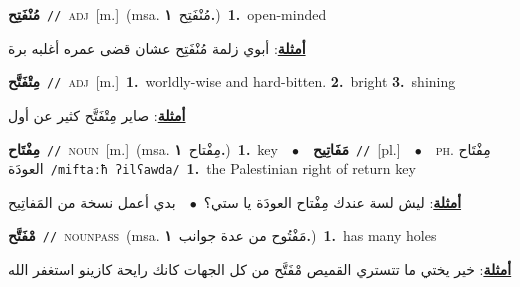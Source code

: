 \documentclass[10pt,a4paper,twoside]{article} %
\begin{document}
\begin{multicols}{2}
{\setlength\topsep{0pt}\textbf{\foreignlanguage{arabic}{مُنْفَتِح}}\ {\color{gray}\texttt{//}\color{black}}\ \textsc{adj}\ [m.]\ \color{gray}(msa. \foreignlanguage{arabic}{مُنْفَتِح}~\foreignlanguage{arabic}{\textbf{١.}})\color{black}\ \textbf{1.}~open-minded\  \begin{flushright}\color{gray}\foreignlanguage{arabic}{\textbf{\underline{\foreignlanguage{arabic}{أمثلة}}}: أبوي زلمة مُنْفَتِح عشان قضى عمره أغلبه برة}\end{flushright}\color{black}} \vspace{2mm}

{\setlength\topsep{0pt}\textbf{\foreignlanguage{arabic}{مِتْفَتَّح}}\ {\color{gray}\texttt{//}\color{black}}\ \textsc{adj}\ [m.]\ \textbf{1.}~worldly-wise and hard-bitten.  \textbf{2.}~bright  \textbf{3.}~shining\  \begin{flushright}\color{gray}\foreignlanguage{arabic}{\textbf{\underline{\foreignlanguage{arabic}{أمثلة}}}: صاير مِتْفَتَّح كثير عن أول}\end{flushright}\color{black}} \vspace{2mm}

{\setlength\topsep{0pt}\textbf{\foreignlanguage{arabic}{مِفْتَاح}}\ {\color{gray}\texttt{//}\color{black}}\ \textsc{noun}\ [m.]\ \color{gray}(msa. \foreignlanguage{arabic}{مِفْتاح}~\foreignlanguage{arabic}{\textbf{١.}})\color{black}\ \textbf{1.}~key\ \ $\bullet$\ \ \setlength\topsep{0pt}\textbf{\foreignlanguage{arabic}{مَفَاتِيح}}\ {\color{gray}\texttt{//}\color{black}}\ [pl.]\ \ $\bullet$\ \ \textsc{ph.} \color{gray} \foreignlanguage{arabic}{مِفْتَاح العودَة}\color{black}\ {\color{gray}\texttt{/{\sffamily miftaːħ ʔilʕawda}/}\color{black}}\ \textbf{1.}~the Palestinian right of return key\  \begin{flushright}\color{gray}\foreignlanguage{arabic}{\textbf{\underline{\foreignlanguage{arabic}{أمثلة}}}: ليش لسة عندك مِفْتاح العودَة يا ستي؟\ $\bullet$\ \  بدي أعمل نسخة من المَفاتِيح}\end{flushright}\color{black}} \vspace{2mm}

{\setlength\topsep{0pt}\textbf{\foreignlanguage{arabic}{مْفَتَّح}}\ {\color{gray}\texttt{//}\color{black}}\ \textsc{noun\textunderscore pass}\ \color{gray}(msa. \foreignlanguage{arabic}{مَفْتُوح من عدة جوانب}~\foreignlanguage{arabic}{\textbf{١.}})\color{black}\ \textbf{1.}~has many holes\  \begin{flushright}\color{gray}\foreignlanguage{arabic}{\textbf{\underline{\foreignlanguage{arabic}{أمثلة}}}: خير يختي ما تتستري القميص مْفَتَّح من كل الجهات كانك رايحة كازينو استغفر الله}\end{flushright}\color{black}} \vspace{2mm}


\end{multicols}
\end{document}
